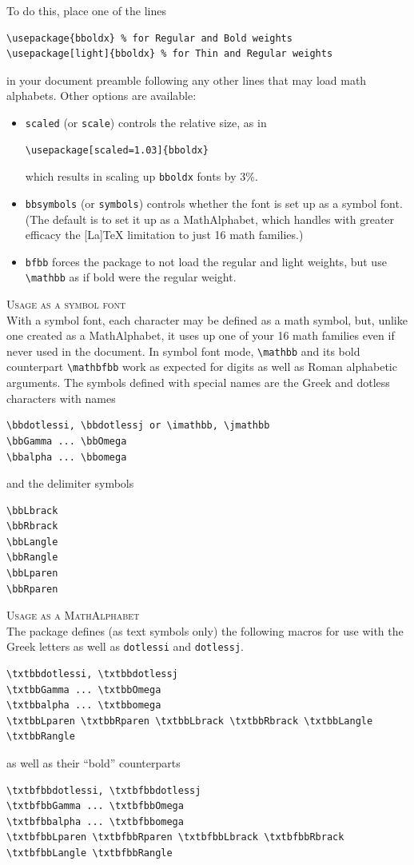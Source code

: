 \documentclass[11pt]{amsart}
\begin{document}
To do this, place one of the lines
\begin{verbatim}
\usepackage{bboldx} % for Regular and Bold weights
\usepackage[light]{bboldx} % for Thin and Regular weights
\end{verbatim}
in your document preamble following any other lines that may load math alphabets. Other options are available:
\begin{itemize}
\item
{\tt scaled} (or {\tt scale}) controls the relative size, as in
\begin{verbatim}
\usepackage[scaled=1.03]{bboldx}
\end{verbatim}
which results in scaling up {\tt bboldx} fonts by 3\%.
\item
{\tt bbsymbols} (or {\tt symbols}) controls whether the  font is set up as a symbol font. (The default is to set it up as a MathAlphabet, which handles with greater efficacy the [La]TeX limitation to just 16 math families.)
\item {\tt bfbb} forces the package to not load the regular and light weights, but use \verb|\mathbb| as if bold were the regular weight. 
\end{itemize}

\textsc{Usage as a symbol font}\\
With a symbol font, each character may be defined as a math symbol, but, unlike one created as a MathAlphabet, it uses up one of your 16 math families even if never used in the document. In symbol font mode, \verb|\mathbb| and its bold counterpart \verb|\mathbfbb| work as expected for digits as well as Roman alphabetic arguments.
The symbols defined with special names are the Greek and dotless characters with names
\begin{verbatim}
\bbdotlessi, \bbdotlessj or \imathbb, \jmathbb
\bbGamma ... \bbOmega
\bbalpha ... \bbomega
\end{verbatim}
and the delimiter symbols
\begin{verbatim}
\bbLbrack
\bbRbrack
\bbLangle
\bbRangle
\bbLparen
\bbRparen
\end{verbatim}

\textsc{Usage as a MathAlphabet}\\
The package defines (as text symbols only) the following macros for use with the Greek letters as well as {\tt dotlessi} and {\tt dotlessj}.
\begin{verbatim}
\txtbbdotlessi, \txtbbdotlessj
\txtbbGamma ... \txtbbOmega
\txtbbalpha ... \txtbbomega
\txtbbLparen \txtbbRparen \txtbbLbrack \txtbbRbrack \txtbbLangle \txtbbRangle
\end{verbatim}
as well as their ``bold'' counterparts
\begin{verbatim}
\txtbfbbdotlessi, \txtbfbbdotlessj
\txtbfbbGamma ... \txtbfbbOmega
\txtbfbbalpha ... \txtbfbbomega
\txtbfbbLparen \txtbfbbRparen \txtbfbbLbrack \txtbfbbRbrack \txtbfbbLangle \txtbfbbRangle
\end{verbatim}
\end{document}
